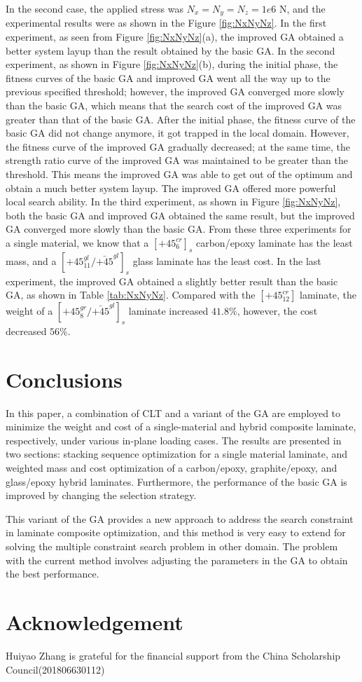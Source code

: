 \documentclass[USenglish,twocolumn]{article}
\begin{document}
In the second case, the applied stress was $N_x=N_y=N_z=1e6$ N, and the experimental results were as
shown in the Figure \ref{fig:NxNyNz}. In the first experiment, as seen from Figure \ref{fig:NxNyNz}(a), the improved GA obtained a
better system layup than the result obtained by the basic GA. In the second experiment, as shown in Figure \ref{fig:NxNyNz}(b), during
the initial phase, the fitness curves of the basic GA and improved GA went all the way up to the
previous specified threshold; however, the improved GA converged more slowly than the basic GA, which
means that the search cost of the improved GA was greater than that of the basic GA. After the initial phase, the fitness
curve of the basic GA did not change anymore, it got trapped in the local domain.
 However, the fitness curve of the
improved GA gradually decreased; at the same time, the strength ratio curve of the improved GA
was maintained to be greater than the threshold. This means the improved GA was able to get out of the optimum
and obtain a much better system layup. The improved GA offered more powerful local search
ability. In the third experiment, as shown in Figure \ref{fig:NxNyNz}, both the basic GA and improved
GA obtained the same result, but the improved GA converged more slowly than the basic GA. From these
three experiments for a single material, we know that a $[\text{+}45_{6}^{cr}]_s$ carbon/epoxy laminate has
the least mass, and a $[\text{+}45_{11}^{gl}/\bar{\text{+}45}^{gl}]_s$ glass laminate has the least
cost. In the last experiment, the improved GA obtained a slightly better result than the basic GA,
as shown in Table \ref{tab:NxNyNz}. Compared with the $[\text{+}45_{12}^{cr}]$ laminate, the
weight of a $[\text{+}45_8^{gr}/\bar{\text{+}45}^{gl}]_s$ laminate increased $41.8\%$, however, the
cost decreased $56\%$.


\section{Conclusions}
In this paper, a combination of CLT and a variant of the GA are employed to minimize the weight and cost
of a single-material and hybrid composite laminate, respectively, under various in-plane loading
cases. The results are presented in two sections: stacking sequence optimization for a single material
laminate, and weighted mass and cost optimization of a carbon/epoxy, graphite/epoxy, and
glass/epoxy hybrid laminates. Furthermore, the performance of the basic GA is improved by changing the
selection strategy.

This variant of the GA provides a new approach to address the search constraint in laminate composite
optimization, and this method is very easy to extend for solving the multiple constraint search problem in other
domain. The problem with the current method involves adjusting the parameters in the GA to obtain the best
performance.

\section{Acknowledgement}
Huiyao Zhang is grateful for the financial support from the China Scholarship Council(201806630112)

%
%
\printbibliography
\end{document}
